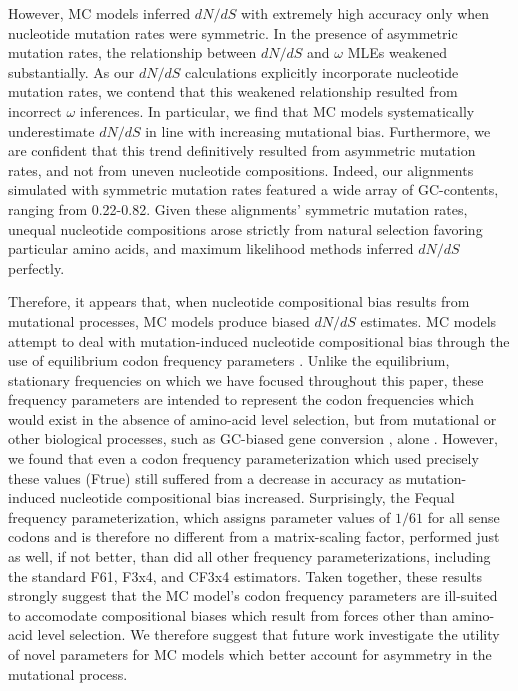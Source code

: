 \documentclass{pnastwo}
\begin{document}
\begin{article}
However, MC models inferred $dN/dS$ with extremely high accuracy only when nucleotide mutation rates were symmetric. In the presence of asymmetric mutation rates, the relationship between $dN/dS$ and $\omega$ MLEs weakened substantially. As our $dN/dS$ calculations explicitly incorporate nucleotide mutation rates, we contend that this weakened relationship resulted from incorrect $\omega$ inferences. In particular, we find that MC models systematically underestimate $dN/dS$ in line with increasing mutational bias. Furthermore, we are confident that this trend definitively resulted from asymmetric mutation rates, and not from uneven nucleotide compositions. Indeed, our alignments simulated with symmetric mutation rates featured a wide array of GC-contents, ranging from 0.22-0.82. Given these alignments' symmetric mutation rates, unequal nucleotide compositions arose strictly from natural selection favoring particular amino acids, and maximum likelihood methods inferred $dN/dS$ perfectly.

Therefore, it appears that, when nucleotide compositional bias results from mutational processes, MC models produce biased $dN/dS$ estimates. MC models attempt to deal with mutation-induced nucleotide compositional bias through the use of equilibrium codon frequency parameters \cite{Yang2006}. Unlike the equilibrium, stationary frequencies on which we have focused throughout this paper, these frequency parameters are intended to represent the codon frequencies which would exist in the absence of amino-acid level selection, but from mutational or other biological processes, such as GC-biased gene conversion \cite{DuretGaltier2009,WebsterHurst2012}, alone \cite{GoldmanYang1994,MuseGaut1994,YN00,Yang2006}. 
However, we found that even a codon frequency parameterization which used precisely these values (Ftrue) still suffered from a decrease in accuracy as mutation-induced nucleotide compositional bias increased. Surprisingly, the Fequal frequency parameterization, which assigns parameter values of $1/61$ for all sense codons and is therefore no different from a matrix-scaling factor, performed just as well, if not better, than did all other frequency parameterizations, including the standard F61, F3x4, and CF3x4 estimators. Taken together, these results strongly suggest that the MC model's codon frequency parameters are ill-suited to accomodate compositional biases which result from forces other than amino-acid level selection. We therefore suggest that future work investigate the utility of novel parameters for MC models which better account for asymmetry in the mutational process.



\end{article}
\end{document}
